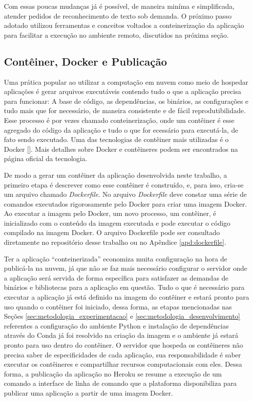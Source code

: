 Com essas poucas mudanças já é possível, de maneira miníma e simplificada, atender pedidos de reconhecimento de texto sob demanda. O próximo 
passo adotado utilizou ferramentas e conceitos voltados a conteinerização da aplicação para facilitar a execução no ambiente remoto, discutidos na 
próxima seção.

\subsection{Contêiner, Docker e Publicação}
Uma prática popular ao utilizar a computação em nuvem como meio de hospedar aplicações é gerar arquivos executáveis contendo tudo o que a aplicação 
precisa para funcionar: A base de código, as dependências, os binários, as configurações e tudo mais que for necessário, de maneira consistente e de 
fácil reprodutibilidade. Esse processo é por vezes chamado conteinerização, onde um contêiner é esse agregado do código da aplicação e tudo o que for 
ecessário para executá-la, de fato sendo executado. Uma das tecnologias de contêiner mais utilizadas é o Docker []. Mais detalhes 
sobre Docker e contêineres podem ser encontrados na página oficial da tecnologia.

De modo a gerar um contêiner da aplicação desenvolvida neste trabalho, a primeiro etapa é descrever como esse contêiner é construído, e, para isso, 
cria-se um arquivo chamado \textit{Dockerfile}. No arquivo \textit{Dockerfile} deve constar uma série de comandos executados rigorosamente pelo Docker 
para criar uma imagem Docker. Ao executar a imagem pelo Docker, um novo processo, um contêiner, é inicializado com o conteúdo da imagem executada e 
pode executar o código compilado na imagem Docker. O arquivo Dockerfile pode ser consultado diretamente no repositório desse trabalho ou no 
Apêndice \ref{apd:dockerfile}.

Ter a aplicação “conteinerizada” economiza muita configuração na hora de publicá-la na nuvem, já que não se faz mais necessário configurar o servidor 
onde a aplicação será servida de forma específica para satisfazer as demandas de binários e bibliotecas para a aplicação em questão. Tudo o que é 
necessário para executar a aplicação já está definido na imagem do contêiner e estará pronto para uso quando o contêiner foi iniciado, dessa forma, 
as etapas mencionadas nas Seções \ref{sec:metodologia_experimentacao} e \ref{sec:metodologia_desenvolvimento} referentes a configuração do ambiente 
Python e instalação de dependências através do Conda já foi resolvido na criação da imagem e o ambiente já estará pronto para uso dentro do contêiner. 
O servidor que hospeda os contêineres não precisa saber de especificidades de cada aplicação, sua responsabilidade é saber executar os contêineres e 
compartilhar recursos computacionais com eles. Dessa forma, a publicação da aplicação no Heroku se resume a execução de um comando a interface de linha 
de comando que a plataforma disponibiliza para publicar uma aplicação a partir de uma imagem Docker.

